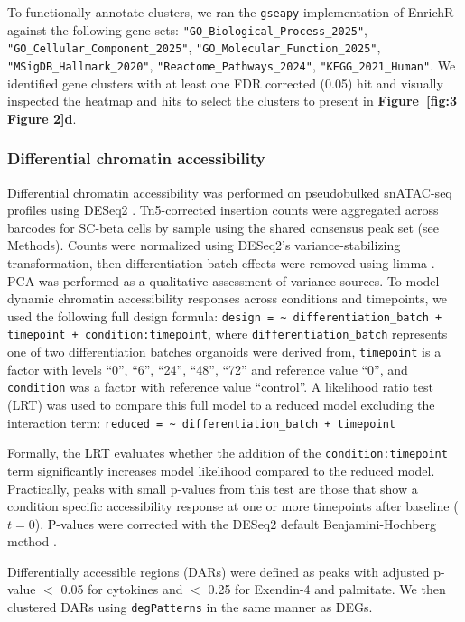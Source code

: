 To functionally annotate clusters, we ran the \texttt{gseapy} \cite{Fang2023-st} implementation of EnrichR \cite{Xie2021-me} against the following gene sets: \texttt{"GO\_Biological\_Process\_2025"}, \texttt{"GO\_Cellular\_Component\_2025"}, \texttt{"GO\_Molecular\_Function\_2025"}, \texttt{"MSigDB\_Hallmark\_2020"}, \texttt{"Reactome\_Pathways\_2024"}, \texttt{"KEGG\_2021\_Human"}. We identified gene clusters with at least one FDR corrected (0.05) hit and visually inspected the heatmap and hits to select the clusters to present in \textbf{Figure~\ref{fig:3 Figure 2}d}.

\subsubsection{Differential chromatin accessibility}

Differential chromatin accessibility was performed on pseudobulked snATAC-seq profiles using DESeq2 \cite{Love2014-rn}. Tn5-corrected insertion counts were aggregated across barcodes for SC-beta cells by sample using the shared consensus peak set (see Methods). Counts were normalized using DESeq2’s variance-stabilizing transformation, then differentiation batch effects were removed using limma \cite{Ritchie2015-ec}. PCA was performed as a qualitative assessment of variance sources. To model dynamic chromatin accessibility responses across conditions and timepoints, we used the following full design formula: \texttt{design = \textasciitilde{} differentiation\_batch + timepoint + condition:timepoint}, where \texttt{differentiation\_batch} represents one of two differentiation batches organoids were derived from, \texttt{timepoint} is a factor with levels ``0'', ``6'', ``24'', ``48'', ``72'' and reference value ``0'', and \texttt{condition} was a factor with reference value ``control''. A likelihood ratio test (LRT) was used to compare this full model to a reduced model excluding the interaction term: \texttt{reduced = \textasciitilde{} differentiation\_batch + timepoint}

Formally, the LRT evaluates whether the addition of the \texttt{condition:timepoint} term significantly increases model likelihood compared to the reduced model. Practically, peaks with small p-values from this test are those that show a condition specific accessibility response at one or more timepoints after baseline (\(t = 0\)). P-values were corrected with the DESeq2 default Benjamini-Hochberg method \cite{Benjamini1995-da}.

Differentially accessible regions (DARs) were defined as peaks with adjusted p-value $<$ 0.05 for cytokines and $<$ 0.25 for Exendin-4 and palmitate. We then clustered DARs using \texttt{degPatterns} in the same manner as DEGs.

